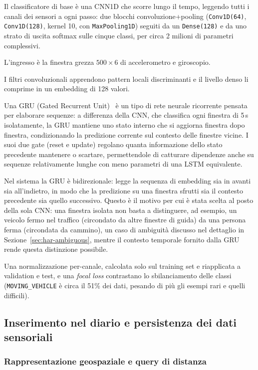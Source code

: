 \documentclass[conference]{IEEEtran}
\begin{document}
Il classificatore di base è una CNN1D che scorre lungo il tempo,
leggendo tutti i canali dei sensori a ogni passo: due blocchi
convoluzione+pooling (\texttt{Conv1D(64)}, \texttt{Conv1D(128)}, kernel
10, con \texttt{MaxPooling1D}) seguiti da un \texttt{Dense(128)} e da
uno strato di uscita softmax sulle cinque classi, per circa 2 milioni
di parametri complessivi.

L'ingresso è la finestra grezza
$500\times6$ di accelerometro e giroscopio.

I filtri convoluzionali apprendono pattern locali discriminanti e il
livello denso li comprime in un embedding di 128 valori.

Una GRU (Gated Recurrent Unit)~\cite{cho2014gru} è un tipo di rete
neurale ricorrente pensata per elaborare sequenze: a differenza della
CNN, che classifica ogni finestra di 5\,s isolatamente, la GRU
mantiene uno stato interno che si aggiorna finestra dopo finestra,
condizionando la predizione corrente sul contesto delle finestre
vicine. I suoi due gate (reset e update) regolano quanta informazione
dello stato precedente mantenere o scartare, permettendole di
catturare dipendenze anche su sequenze relativamente lunghe con meno
parametri di una LSTM equivalente.

Nel sistema la GRU è bidirezionale: legge la sequenza di embedding sia
in avanti sia all'indietro, in modo che la predizione su una finestra
sfrutti sia il contesto precedente sia quello successivo. Questo è il
motivo per cui è stata scelta al posto della sola CNN: una finestra
isolata non basta a distinguere, ad esempio, un veicolo fermo nel
traffico (circondato da altre finestre di guida) da una persona ferma
(circondata da cammino), un caso di ambiguità discusso nel dettaglio
in Sezione~\ref{sec:har-ambiguous}, mentre il contesto temporale
fornito dalla GRU rende questa distinzione possibile.

Una normalizzazione per-canale, calcolata solo sul training set e
riapplicata a validation e test, e una \emph{focal loss} contrastano
lo sbilanciamento delle classi (\texttt{MOVING\_VEHICLE} è circa il
51\% dei dati, pesando di più gli esempi rari e quelli difficili).




\subsection{Inserimento nel diario e persistenza dei dati sensoriali}

\subsubsection{Rappresentazione geospaziale e query di distanza}
\end{document}
